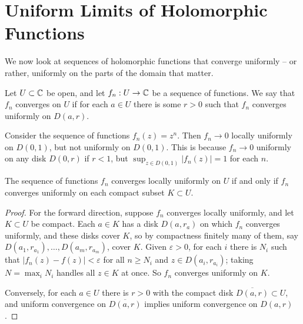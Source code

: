 \documentclass[a4paper]{scrartcl}
\begin{document}
\section{Uniform Limits of Holomorphic Functions}

We now look at sequences of holomorphic functions that converge uniformly -- or rather, uniformly on the parts of the domain that matter.

\begin{definition}
    Let $U \subset \mathbb{C}$ be open, and let $f_n : U \rightarrow \mathbb{C}$ be a sequence
    of functions. We say that $f_n$ converges  on $U$ if for each $a \in U$ there is some $r > 0$ such that $f_n$ converges uniformly on $D(a, r)$.
\end{definition}

\begin{example}
    Consider the sequence of functions $f_n(z) = z^n$. Then $f_n \rightarrow 0$ locally uniformly on $D(0, 1)$, but not uniformly on $D(0, 1)$. This is because $f_n \rightarrow 0$ uniformly on any disk $D(0, r)$ if $r < 1$, but $\sup_{z \in D(0, 1)} |f_n(z)| = 1$ for each $n$.
\end{example}

\begin{proposition}
    The sequence of functions $f_n$ converges locally uniformly on $U$ if and only if $f_n$ converges uniformly on each compact subset $K \subset U$.
\end{proposition}
\begin{proof}
    For the forward direction, suppose $f_n$ converges locally uniformly, and let $K \subset U$ be compact. Each $a \in K$ has a disk $D(a, r_a)$ on which $f_n$ converges uniformly, and these disks cover $K$, so by compactness finitely many of them, say $D(a_1, r_{a_1}), \dots, D(a_m, r_{a_m})$, cover $K$. Given $\varepsilon > 0$, for each $i$ there is $N_i$ such that $|f_n(z) - f(z)| < \varepsilon$ for all $n \geq N_i$ and $z \in D(a_i, r_{a_i})$; taking $N = \max_i N_i$ handles all $z \in K$ at once. So $f_n$ converges uniformly on $K$.

    Conversely, for each $a \in U$ there is $r > 0$ with the compact disk $\overline{D(a, r)} \subset U$, and uniform convergence on $\overline{D(a, r)}$ implies uniform convergence on $D(a, r)$.
\end{proof}
\end{document}
